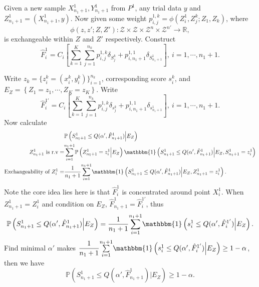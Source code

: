 \documentclass[12pt, a4paper, oneside]{article}
\begin{document}
    
    Given a new sample $X_{n_1+1}^1,Y_{n_1+1}^1$ from $P^1$, any trial data $y$ and $Z_{n_1+1}^1=(X_{n_1+1}^1,y)$. Now given some weight $p_{i,j}^{1,k}=\phi(Z_i^1,Z_j^k;Z_1,Z_k)$, where
    \begin{equation*}
        \phi(z,z';Z,Z'):\mathcal{Z}\times\mathcal{Z}\times\mathcal{Z}^{n}\times\mathcal{Z}^{n'}\rightarrow\mathbb{R},
    \end{equation*}
    is exchangeable within $Z$ and $Z'$ respectively. Construct
    \begin{equation*}
        \hat{F}_i^1=C_i\left[ \overset{K}{\underset{k=1}\sum}\overset{n_k}{\underset{j=1}\sum}p_{i,j}^{1,k}\delta_{S_j^k}+p_{i,n_1+1}^{1,1}\delta_{S_{n_1+1}^1} \right],\ i=1,\cdots,n_1+1.
    \end{equation*}


    Write $z_k=\{z_i^k=(x_i^k,y_i^k)\}_{i=1}^{n_k}$, corresponding score $s_i^k$, and $E_Z=\left\{ Z_1=z_1,\cdots,Z_K=z_K \right\}$. Write
    \begin{equation*}
        \hat{F}_i^{1'}=C_i\left[ \overset{K}{\underset{k=1}\sum}\overset{n_k}{\underset{j=1}\sum}p_{i,j}^{1,k}\delta_{s_j^k}+p_{i,n_1+1}^{1,1}\delta_{s_{n_1+1}^1} \right],\ i=1,\cdots,n_1+1.
    \end{equation*}
    Now calculate
    \begin{align*}
        &\mathbb{P}\left( S_{n_1+1}^1\leq Q(\alpha',\hat{F}_{n_1+1}^1)\Big|E_Z \right)\\
        \text{$Z_{n_1+1}^1$ is r.v}=&\overset{n_1+1}{\underset{i=1}\sum}\mathbb{P}\left( Z_{n_1+1}^1=z_i^1\Big|E_Z \right)\mathbbm{1}\left( S_{n_1+1}^1\leq Q(\alpha',\hat{F}_{n_1+1}^1)\Big|E_Z,S_{n_1+1}^1=z_i^1 \right)\\
        \text{Exchangeability of $Z_i^1$}=&\dfrac{1}{n_1+1}\overset{n_1+1}{\underset{i=1}\sum}\mathbbm{1}\left( S_{n_1+1}^1\leq Q(\alpha',\hat{F}_{n_1+1}^1)\Big|E_Z,Z_{n_1+1}^1=z_i^1 \right).
    \end{align*}
    Note the core idea lies here is that $\hat{F}_i^1$ is concentrated around point $X_i^1$. When $Z_{n_1+1}^1=Z_i^1$ and condition on $E_Z$, $\hat{F}_{n_1+1}^1=\hat{F}_i^{1'}$, thus
    \begin{align*}
        \mathbb{P}\left( S_{n_1+1}^1\leq Q(\alpha',\hat{F}_{n_1+1}^1)\Big|E_Z \right)=\dfrac{1}{n_1+1}\overset{n_1+1}{\underset{i=1}\sum}\mathbbm{1}\left( s_i^1\leq Q(\alpha',\hat{F}_i^{1'})\Big|E_Z \right).
    \end{align*}
    Find minimal $\alpha'$ makes $\dfrac{1}{n_1+1}\overset{n_1+1}{\underset{i=1}\sum}\mathbbm{1}\left( s_i^1\leq Q(\alpha',\hat{F}_i^{1'})\Big|E_Z \right)\geq 1-\alpha$, then we have
    \begin{equation*}
        \mathbb{P}\left( S_{n_1+1}^1\leq Q(\alpha',\hat{F}_{n_1+1}^1)\Big|E_Z \right)\geq 1-\alpha.
    \end{equation*}
\end{document}
